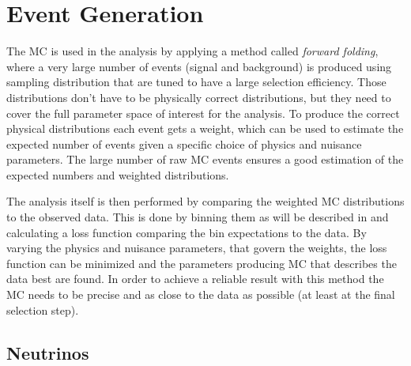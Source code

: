 

\section{Event Generation} 

The MC is used in the analysis by applying a method called \textit{forward folding}, where a very large number of events (signal and background) is produced using sampling distribution that are tuned to have a large selection efficiency. Those distributions don't have to be physically correct distributions, but they need to cover the full parameter space of interest for the analysis. To produce the correct physical distributions each event gets a weight, which can be used to estimate the expected number of events given a specific choice of physics and nuisance parameters. The large number of raw MC events ensures a good estimation of the expected numbers and weighted distributions. 

The analysis itself is then performed by comparing the weighted MC distributions to the observed data. This is done by binning them as will be described in  and calculating a loss function comparing the bin expectations to the data. By varying the physics and nuisance parameters, that govern the weights, the loss function can be minimized and the parameters producing MC that describes the data best are found. In order to achieve a reliable result with this method the MC needs to be precise and as close to the data as possible (at least at the final selection step). 


\subsection{Neutrinos}

